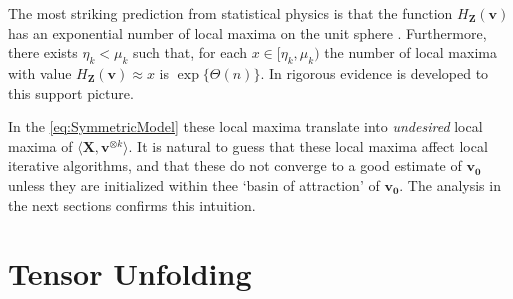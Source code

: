 \documentclass[11pt]{article}
\theoremstyle{definition}
\def\<{\langle}
\def\>{\rangle}
\def\bv{\mathbf{v}}
\def\bvz{\mathbf{v_0}}
\def\bX{\mathbf{X}}
\def\bZ{\mathbf{Z}}
\def\ok{{^{\otimes k}}}
\begin{document}
The most striking prediction from statistical physics is that the
function $H_{\bZ}(\bv)$  has an exponential number of local maxima 
on the unit sphere \cite{crisanti1995thouless}. Furthermore, there exists $\eta_k<\mu_k$ such
that, for each $x\in [\eta_k,\mu_k)$ the number of local maxima with
value $H_{\bZ}(\bv) \approx x$ is $\exp\{\Theta(n)\}$.
In \cite{Auffinger13} rigorous evidence is developed to this support picture.

In the \ref{eq:SymmetricModel} these local maxima translate into {\em undesired} local maxima of
$\<\bX,\bv\ok\>$.  It is natural to guess that  these local maxima
affect local iterative algorithms, and that these
do not converge to a good estimate of $\bvz$ unless they are
initialized within thee `basin of attraction' of $\bvz$.
The analysis in the next sections confirms this intuition.

\section{Tensor Unfolding}
\label{sec:Unfolding}
\end{document}

